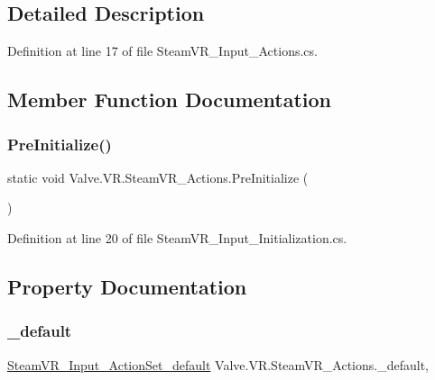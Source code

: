 \subsection{Detailed Description}


Definition at line 17 of file Steam\+V\+R\+\_\+\+Input\+\_\+\+Actions.\+cs.



\subsection{Member Function Documentation}
\mbox{\label{class_valve_1_1_v_r_1_1_steam_v_r___actions_a46f5f41d90f1623fee121e0fbd2dc358}} 
\subsubsection{\texorpdfstring{PreInitialize()}{PreInitialize()}}
{\footnotesize\ttfamily static void Valve.\+V\+R.\+Steam\+V\+R\+\_\+\+Actions.\+Pre\+Initialize (\begin{DoxyParamCaption}{ }\end{DoxyParamCaption})\hspace{0.3cm}{\ttfamily [static]}}



Definition at line 20 of file Steam\+V\+R\+\_\+\+Input\+\_\+\+Initialization.\+cs.



\subsection{Property Documentation}
\mbox{\label{class_valve_1_1_v_r_1_1_steam_v_r___actions_a02ff0421f892466ae8108b9547447af2}} 
\subsubsection{\texorpdfstring{\_default}{\_default}}
{\footnotesize\ttfamily \mbox{\hyperlink{class_valve_1_1_v_r_1_1_steam_v_r___input___action_set__default}{Steam\+V\+R\+\_\+\+Input\+\_\+\+Action\+Set\+\_\+default}} Valve.\+V\+R.\+Steam\+V\+R\+\_\+\+Actions.\+\_\+default\hspace{0.3cm}{\ttfamily [static]}, {\ttfamily [get]}}



